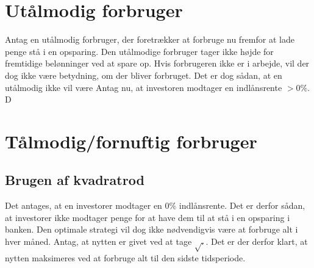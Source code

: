 \fi





\section{Utålmodig forbruger}
Antag en utålmodig forbruger, der foretrækker at forbruge nu fremfor at lade penge stå i en opsparing. Den utålmodige forbruger tager ikke højde for fremtidige belønninger ved at spare op.
Hvis forbrugeren ikke er i arbejde, vil der dog ikke være betydning, om der bliver forbruget. Det er dog sådan, at en utålmodig ikke vil være 
Antag nu, at investoren modtager en indlånsrente $>0\%$. D



\section{Tålmodig/fornuftig forbruger}







\subsection{Brugen af kvadratrod}
Det antages, at en investorer modtager en 0\% indlånsrente. Det er derfor sådan, at investorer ikke modtager penge for at have dem til at stå i en opsparing i banken. Den optimale strategi vil dog ikke nødvendigvis være at forbruge alt i hver måned. 
Antag, at nytten er givet ved at tage $\sqrt{.}$. Det er der derfor klart, at nytten maksimeres ved at forbruge alt til den sidste tidsperiode.